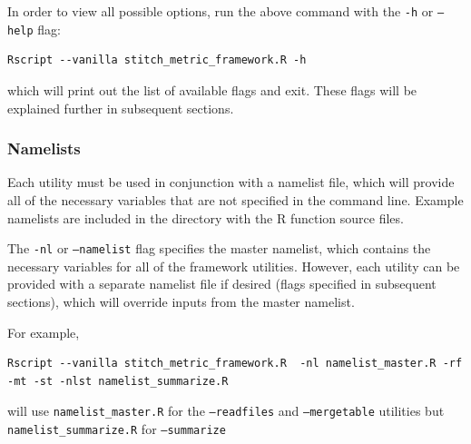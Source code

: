 \documentclass{article}
\begin{document}
In order to view all possible options, run the above command with the \texttt{-h} or \texttt{--help} flag:
\begin{verbatim}
Rscript --vanilla stitch_metric_framework.R -h
\end{verbatim}

which will print out the list of available flags and exit. These flags will be explained further in subsequent sections.

\subsubsection{Namelists}
Each utility must be used in conjunction with a namelist file, which will provide all of the necessary variables that are not specified in the command line. Example namelists are included in the directory with the R function source files.

The \texttt{-nl} or \texttt{--namelist} flag specifies the master namelist, which contains the necessary variables for all of the framework utilities. However, each utility can be provided with a separate namelist file if desired (flags specified in subsequent sections), which will override inputs from the master namelist.

For example, 

\begin{verbatim}
Rscript --vanilla stitch_metric_framework.R  -nl namelist_master.R -rf
-mt -st -nlst namelist_summarize.R
\end{verbatim}

will use \texttt{namelist\_master.R} for the \texttt{--readfiles} and \texttt{--mergetable} utilities but \texttt{namelist\_summarize.R} for \texttt{--summarize}

%
%
%
%
%
\end{document}
